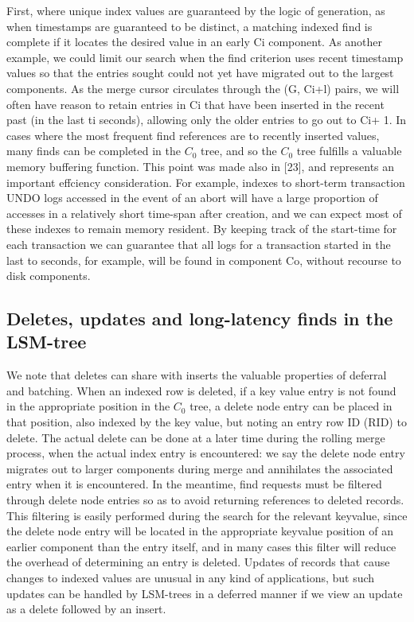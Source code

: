 \documentclass[a4paper,12pt,notitlepage,twoside,openright]{article}
\begin{document}
First, where unique index values are guaranteed by the logic of
generation, as when timestamps are guaranteed to be distinct, a matching
indexed find is complete if it locates the desired value in an early Ci
component. As another example, we could limit our search when the find
criterion uses recent timestamp values so that the entries sought could
not yet have migrated out to the largest components. As the merge cursor
circulates through the (G, Ci+l) pairs, we will often have reason to
retain entries in Ci that have been inserted in the recent past (in the
last ti seconds), allowing only the older entries to go out to Ci+ 1. In
cases where the most frequent find references are to recently inserted
values, many finds can be completed in the \(C_0\) tree, and so the \(C_0\) tree
fulfills a valuable memory buffering function. This point was made also
in {[}23{]}, and represents an important effciency consideration. For
example, indexes to short-term transaction UNDO logs accessed in the
event of an abort will have a large proportion of accesses in a
relatively short time-span after creation, and we can expect most of
these indexes to remain memory resident. By keeping track of the
start-time for each transaction we can guarantee that all logs for a
transaction started in the last to seconds, for example, will be found
in component Co, without recourse to disk components.


\hypertarget{deletes-updates-and-long-latency-finds-in-the-lsm-tree}{%
\subsection{Deletes, updates and long-latency finds in the
LSM-tree}\label{deletes-updates-and-long-latency-finds-in-the-lsm-tree}}


We note that deletes can share with inserts the valuable properties of
deferral and batching. When an indexed row is deleted, if a key value
entry is not found in the appropriate position in the \(C_0\) tree, a delete
node entry can be placed in that position, also indexed by the key
value, but noting an entry row ID (RID) to delete. The actual delete can
be done at a later time during the rolling merge process, when the
actual index entry is encountered: we say the delete node entry migrates
out to larger components during merge and annihilates the associated
entry when it is encountered. In the meantime, find requests must be
filtered through delete node entries so as to avoid returning references
to deleted records. This filtering is easily performed during the search
for the relevant keyvalue, since the delete node entry will be located
in the appropriate keyvalue position of an earlier component than the
entry itself, and in many cases this filter will reduce the overhead of
determining an entry is deleted. Updates of records that cause changes
to indexed values are unusual in any kind of applications, but such
updates can be handled by LSM-trees in a deferred manner if we view an
update as a delete followed by an insert.
\end{document}
